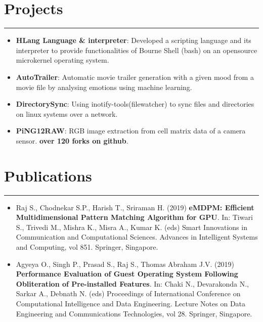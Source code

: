 \documentclass[a4paper,6pt]{article}
\begin{document}
\vspace{-9px}
\section*{Projects}
\vspace{-8px}
\hrule
\vspace{4px}
\hspace{5px}
\begin{itemize}
    \item \textbf{HLang Language \& interpreter}: \small Developed a scripting language and its interpreter to provide functionalities of Bourne Shell (bash) on an opensource microkernel operating system.
\normalsize
\vspace{2px}
	\item \textbf{AutoTrailer}: \small Automatic movie trailer generation with a given mood from a movie file by analysing emotions using machine learning. 
\vspace{2px}
\normalsize
	\item \textbf{DirectorySync}: \small Using inotify-tools(filewatcher) to sync files and directories on linux systems over a network.
\vspace{2px}
\normalsize
	\item \textbf{PiNG12RAW}: \small RGB image extraction from cell matrix data of a camera sensor. \textcolor{mygray}{\textbf{over 120 forks on github}}. 
\normalsize
\end{itemize}

\vspace{-9px}
\section*{Publications}
\vspace{-8px}
\hrule
\vspace{8px}
\begin{itemize}
	\item \small Raj S., Chodnekar S.P., Harish T., Sriraman H. (2019) \textcolor{mygray}{\textbf{eMDPM: Efficient Multidimensional Pattern Matching Algorithm for GPU}}. In: Tiwari S., Trivedi M., Mishra K., Misra A., Kumar K. (eds) Smart Innovations in Communication and Computational Sciences. Advances in Intelligent Systems and Computing, vol 851. Springer, Singapore. 
\normalsize
\vspace{2px}
	\item \small Agyeya O., Singh P., Prasad S., Raj S., Thomas Abraham J.V. (2019) \textcolor{mygray}{\textbf{Performance Evaluation of Guest Operating System Following Obliteration of Pre-installed Features}}. In: Chaki N., Devarakonda N., Sarkar A., Debnath N. (eds) Proceedings of International Conference on Computational Intelligence and Data Engineering. Lecture Notes on Data Engineering and Communications Technologies, vol 28. Springer, Singapore.
\normalsize
\end{itemize}
\end{document}
